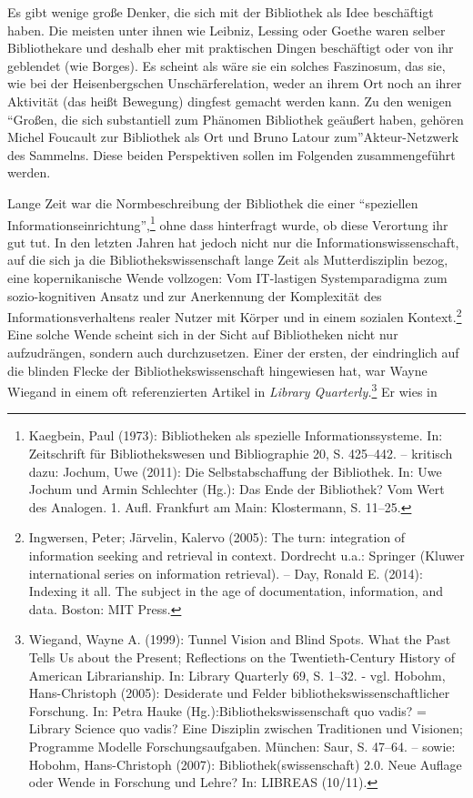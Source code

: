 Es gibt wenige große Denker, die sich mit der Bibliothek als Idee
beschäftigt haben. Die meisten unter ihnen wie Leibniz, Lessing oder
Goethe waren selber Bibliothekare und deshalb eher mit praktischen
Dingen beschäftigt oder von ihr geblendet (wie Borges). Es scheint als
wäre sie ein solches Faszinosum, das sie, wie bei der Heisenbergschen
Unschärferelation, weder an ihrem Ort noch an ihrer Aktivität (das heißt
Bewegung) dingfest gemacht werden kann. Zu den wenigen \enquote{Großen,
die sich substantiell zum Phänomen Bibliothek geäußert haben, gehören
Michel Foucault zur Bibliothek als Ort und Bruno Latour
zum}Akteur-Netzwerk des Sammelns. Diese beiden Perspektiven sollen im
Folgenden zusammengeführt werden.

Lange Zeit war die Normbeschreibung der Bibliothek die einer
\enquote{speziellen Informationseinrichtung},\footnote{Kaegbein, Paul (1973):
  Bibliotheken als spezielle Informationssysteme. In: Zeitschrift für
  Bibliothekswesen und Bibliographie 20, S. 425--442. -- kritisch dazu:
  Jochum, Uwe (2011): Die Selbstabschaffung der Bibliothek. In: Uwe
  Jochum und Armin Schlechter (Hg.): Das Ende der Bibliothek? Vom Wert
  des Analogen. 1. Aufl. Frankfurt am Main: Klostermann, S. 11--25.}
ohne dass hinterfragt wurde, ob diese Verortung ihr gut tut. In den
letzten Jahren hat jedoch nicht nur die Informationswissenschaft, auf
die sich ja die Bibliothekswissenschaft lange Zeit als Mutterdisziplin
bezog, eine kopernikanische Wende vollzogen: Vom IT-lastigen
Systemparadigma zum sozio-kognitiven Ansatz und zur Anerkennung der
Komplexität des Informationsverhaltens realer Nutzer mit Körper und in
einem sozialen Kontext.\footnote{Ingwersen, Peter; Järvelin, Kalervo
  (2005): The turn: integration of information seeking and retrieval in
  context. Dordrecht u.a.: Springer (Kluwer international series on
  information retrieval). -- Day, Ronald E. (2014): Indexing it all. The
  subject in the age of documentation, information, and data. Boston:
  MIT Press.} Eine solche Wende scheint sich in der Sicht auf
Bibliotheken nicht nur aufzudrängen, sondern auch durchzusetzen. Einer
der ersten, der eindringlich auf die blinden Flecke der
Bibliothekswissenschaft hingewiesen hat, war Wayne Wiegand in einem oft
referenzierten Artikel in \emph{Library Quarterly.}\footnote{Wiegand,
  Wayne A. (1999): Tunnel Vision and Blind Spots. What the Past Tells Us
  about the Present; Reflections on the Twentieth-Century History of
  American Librarianship. In: Library Quarterly 69, S. 1--32. - vgl.
  Hobohm, Hans-Christoph (2005): Desiderate und Felder
  bibliothekswissenschaftlicher Forschung. In: Petra Hauke
  (Hg.):Bibliothekswissenschaft quo vadis? = Library Science quo vadis?
  Eine Disziplin zwischen Traditionen und Visionen; Programme Modelle
  Forschungsaufgaben. München: Saur, S. 47--64. -- sowie: Hobohm,
  Hans-Christoph (2007): Bibliothek(swissenschaft) 2.0. Neue Auflage
  oder Wende in Forschung und Lehre? In: LIBREAS (10/11).} Er wies in

